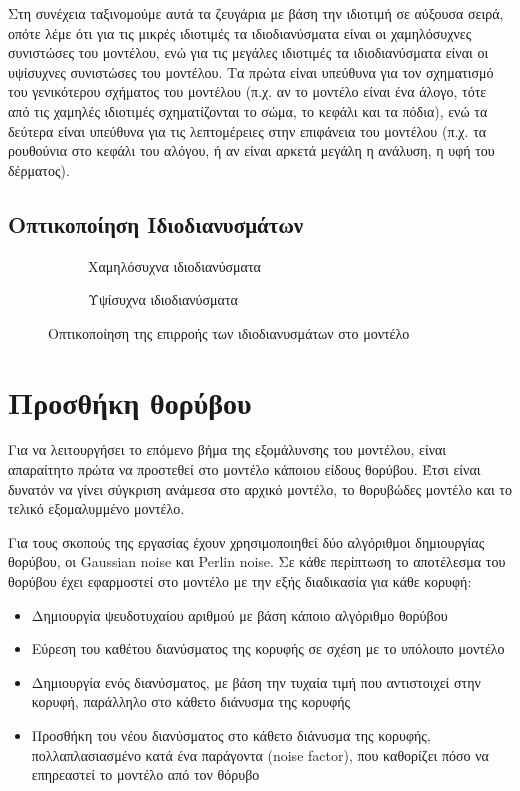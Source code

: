 \documentclass{article}
\begin{document}
Στη συνέχεια ταξινομούμε αυτά τα ζευγάρια με βάση την ιδιοτιμή σε αύξουσα σειρά,
οπότε λέμε ότι για τις μικρές ιδιοτιμές τα ιδιοδιανύσματα είναι οι χαμηλόσυχνες
συνιστώσες του μοντέλου,
ενώ για τις μεγάλες ιδιοτιμές τα ιδιοδιανύσματα είναι οι υψίσυχνες συνιστώσες του μοντέλου.
Τα πρώτα είναι υπεύθυνα για τον σχηματισμό του γενικότερου σχήματος του μοντέλου
(π.χ. αν το μοντέλο είναι ένα άλογο, τότε από τις χαμηλές ιδιοτιμές σχηματίζονται το
σώμα, το κεφάλι και τα πόδια), ενώ τα δεύτερα είναι υπεύθυνα για τις λεπτομέρειες στην
επιφάνεια του μοντέλου (π.χ. τα ρουθούνια στο κεφάλι του αλόγου,
ή αν είναι αρκετά μεγάλη η ανάλυση, η υφή του δέρματος).

\subsection{Οπτικοποίηση Ιδιοδιανυσμάτων}

\begin{figure}[h]
	\begin{subfigure}{0.5\textwidth}
		\caption{Χαμηλόσυχνα ιδιοδιανύσματα}
	\end{subfigure}
	\begin{subfigure}{0.5\textwidth}
		\caption{Υψίσυχνα ιδιοδιανύσματα}
	\end{subfigure}
	\caption{Οπτικοποίηση της επιρροής των ιδιοδιανυσμάτων στο μοντέλο}
\end{figure}


\section{Προσθήκη θορύβου}
Για να λειτουργήσει το επόμενο βήμα της εξομάλυνσης του μοντέλου,
είναι απαραίτητο πρώτα να προστεθεί στο μοντέλο κάποιου είδους θορύβου.
Έτσι είναι δυνατόν να γίνει σύγκριση ανάμεσα στο αρχικό μοντέλο,
το θορυβώδες μοντέλο και το τελικό εξομαλυμμένο μοντέλο.

Για τους σκοπούς της εργασίας έχουν χρησιμοποιηθεί δύο αλγόριθμοι
δημιουργίας θορύβου, οι Gaussian noise και Perlin noise.
Σε κάθε περίπτωση το αποτέλεσμα του θορύβου έχει εφαρμοστεί στο
μοντέλο με την εξής διαδικασία για κάθε κορυφή:

\begin{itemize}
	\item Δημιουργία ψευδοτυχαίου αριθμού με βάση κάποιο αλγόριθμο θορύβου
	\item Εύρεση του καθέτου διανύσματος της κορυφής σε σχέση με το υπόλοιπο μοντέλο
	\item Δημιουργία ενός διανύσματος, με βάση την τυχαία τιμή που αντιστοιχεί στην
		κορυφή, παράλληλο στο κάθετο διάνυσμα της κορυφής
	\item Προσθήκη του νέου διανύσματος στο κάθετο διάνυσμα της κορυφής,
		πολλαπλασιασμένο κατά ένα παράγοντα (noise factor),
		που καθορίζει πόσο να επηρεαστεί το μοντέλο από τον θόρυβο
\end{itemize}
\end{document}

